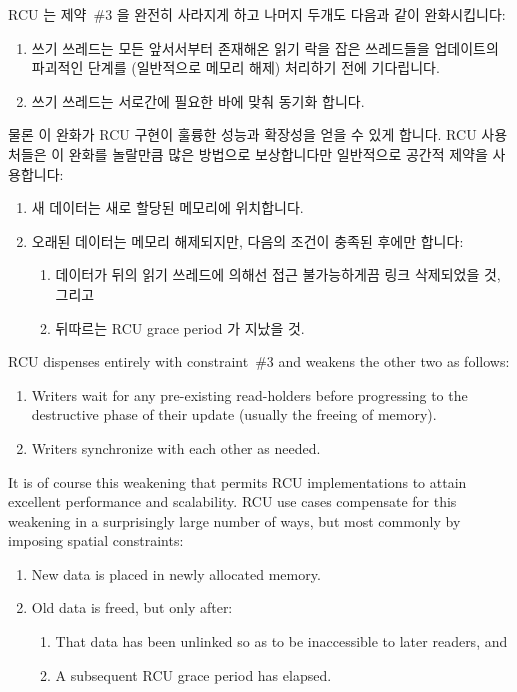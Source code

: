 \fi

RCU 는 제약~\#3 을 완전히 사라지게 하고 나머지 두개도 다음과 같이 완화시킵니다:

\begin{enumerate}
\item	쓰기 쓰레드는 모든 앞서서부터 존재해온 읽기 락을 잡은 쓰레드들을
	업데이트의 파괴적인 단계를 (일반적으로 메모리 해제) 처리하기 전에
	기다립니다.
\item	쓰기 쓰레드는 서로간에 필요한 바에 맞춰 동기화 합니다.
\end{enumerate}

물론 이 완화가 RCU 구현이 훌륭한 성능과 확장성을 얻을 수 있게 합니다.
RCU 사용처들은 이 완화를 놀랄만큼 많은 방법으로 보상합니다만 일반적으로 공간적
제약을 사용합니다:

\begin{enumerate}
\item	새 데이터는 새로 할당된 메모리에 위치합니다.
\item	오래된 데이터는 메모리 해제되지만, 다음의 조건이 충족된 후에만 합니다:
	\begin{enumerate}
	\item	데이터가 뒤의 읽기 쓰레드에 의해선 접근 불가능하게끔 링크
		삭제되었을 것, 그리고
	\item	뒤따르는 RCU grace period 가 지났을 것.
	\end{enumerate}
\end{enumerate}

\iffalse

RCU dispenses entirely with constraint~\#3 and weakens the other two
as follows:

\begin{enumerate}
\item	Writers wait for any pre-existing read-holders before progressing
	to the destructive phase of their update (usually the freeing of
	memory).
\item	Writers synchronize with each other as needed.
\end{enumerate}

It is of course this weakening that permits RCU implementations to attain
excellent performance and scalability.
RCU use cases compensate for this weakening in a surprisingly large number
of ways, but most commonly by imposing spatial constraints:

\begin{enumerate}
\item	New data is placed in newly allocated memory.
\item	Old data is freed, but only after:
	\begin{enumerate}
	\item	That data has been unlinked so as to be inaccessible
		to later readers, and
	\item	A subsequent RCU grace period has elapsed.
	\end{enumerate}
\end{enumerate}


